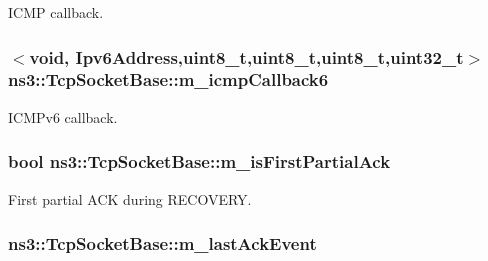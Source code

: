 I\+C\+MP callback. 

\subsubsection[{\texorpdfstring{m\+\_\+icmp\+Callback6}{m_icmpCallback6}}]{$<$void, {\bf Ipv6\+Address},uint8\+\_\+t,uint8\+\_\+t,uint8\+\_\+t,uint32\+\_\+t$>$ ns3\+::\+Tcp\+Socket\+Base\+::m\+\_\+icmp\+Callback6\hspace{0.3cm}{\ttfamily [protected]}}\hypertarget{classns3_1_1TcpSocketBase_a75aca0603de58d7db7c0fa7daab34064}{}\label{classns3_1_1TcpSocketBase_a75aca0603de58d7db7c0fa7daab34064}


I\+C\+M\+Pv6 callback. 

\subsubsection[{\texorpdfstring{m\+\_\+is\+First\+Partial\+Ack}{m_isFirstPartialAck}}]{\setlength{\rightskip}{0pt plus 5cm}bool ns3\+::\+Tcp\+Socket\+Base\+::m\+\_\+is\+First\+Partial\+Ack\hspace{0.3cm}{\ttfamily [protected]}}\hypertarget{classns3_1_1TcpSocketBase_ad68f7d239e22043ba999101b94770d90}{}\label{classns3_1_1TcpSocketBase_ad68f7d239e22043ba999101b94770d90}


First partial A\+CK during R\+E\+C\+O\+V\+E\+RY. 

\subsubsection[{\texorpdfstring{m\+\_\+last\+Ack\+Event}{m_lastAckEvent}}]{ ns3\+::\+Tcp\+Socket\+Base\+::m\+\_\+last\+Ack\+Event\hspace{0.3cm}{\ttfamily [protected]}}\hypertarget{classns3_1_1TcpSocketBase_ac6933cbf3722ece8188d40a889c45649}{}\label{classns3_1_1TcpSocketBase_ac6933cbf3722ece8188d40a889c45649}


